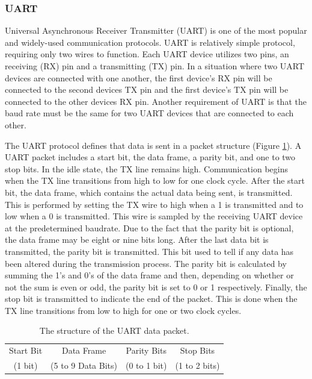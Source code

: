 \subsubsection{UART}
Universal Asynchronous Receiver Transmitter (UART) is one of the most popular and widely-used communication protocols. UART is relatively simple protocol, requiring only two wires to function. Each UART device utilizes two pins, an receiving (RX) pin and a transmitting (TX) pin. In a situation where two UART devices are connected with one another, the first device's RX pin will be connected to the second devices TX pin and the first device's TX pin will be connected to the other devices RX pin. Another requirement of UART is that the baud rate must be the same for two UART devices that are connected to each other.

The UART protocol defines that data is sent in a packet structure (Figure \ref{fig:uart-data-packet}). A UART packet includes a start bit, the data frame, a parity bit, and one to two stop bits. In the idle state, the TX line remains high. Communication begins when the TX line transitions from high to low for one clock cycle. After the start bit, the data frame, which contains the actual data being sent, is transmitted. This is performed by setting the TX wire to high when a 1 is transmitted and to low when a 0 is transmitted. This wire is sampled by the receiving UART device at the predetermined baudrate. Due to the fact that the parity bit is optional, the data frame may be eight or nine bits long. After the last data bit is transmitted, the parity bit is transmitted. This bit used to tell if any data has been altered during the transmission process. The parity bit is calculated by summing the 1's and 0's of the data frame and then, depending on whether or not the sum is even or odd, the parity bit is set to 0 or 1 respectively. Finally, the stop bit is transmitted to indicate the end of the packet. This is done when the TX line transitions from low to high for one or two clock cycles.


\begin{table}[]
    \centering
    \begin{tabular}{|c|c|c|c|}
    \hline
    Start Bit & Data Frame & Parity Bits & Stop Bits \\
    (1 bit) & (5 to 9 Data Bits) & (0 to 1 bit) & (1 to 2 bits) \\\hline
    \end{tabular}
    \caption{The structure of the UART data packet.}
    \label{fig:uart-data-packet}
\end{table}


